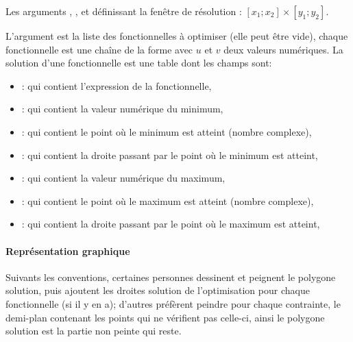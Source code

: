 Les arguments , ,  et  définissant la fenêtre de résolution : $[x_1;x_2]\times [y_1;y_2]$.

L'argument  est la liste des fonctionnelles à optimiser (elle peut être vide), chaque fonctionnelle est une chaîne de la forme  avec $u$ et $v$ deux valeurs numériques. La solution d'une fonctionnelle est une table dont les champs sont:
    \begin{itemize}
        \item {} : qui contient l'expression de la fonctionnelle,
        \item {} : qui contient la valeur numérique du minimum,
        \item {} : qui contient le point où le minimum est atteint (nombre complexe),
        \item {} : qui contient la droite passant par le point où le minimum est atteint,
        \item {} : qui contient la valeur numérique du maximum,
        \item {} : qui contient le point où le maximum est atteint (nombre complexe),
        \item {} : qui contient la droite passant par le point où le maximum est atteint,
    \end{itemize}
    
\paragraph{Représentation graphique}

Suivants les conventions, certaines personnes dessinent et peignent le polygone solution, puis ajoutent les droites solution de l'optimisation pour chaque fonctionnelle (si il y en a); d'autres préfèrent peindre pour chaque contrainte, le demi-plan contenant les points qui ne vérifient pas celle-ci, ainsi le polygone solution est la partie non peinte qui reste.

